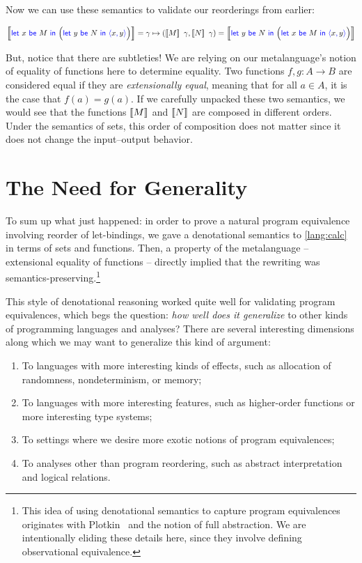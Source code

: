 Now we can use these semantics to validate our reorderings from earlier:
\begin{fullwidth}
\begin{align*}
  \dbracket{\pllet{x}{M}{\Big( \pllet{y}{N}{\plpair{x}{y}} \Big)}}
  = \gamma \mapsto (\dbracket{M}~\gamma, \dbracket{N}~\gamma)
  = \dbracket{\pllet{y}{N}{\Big( \pllet{x}{M}{\plpair{x}{y}} \Big)}}
\end{align*}
\end{fullwidth}

But, notice that there are subtleties! We are relying on our metalanguage's
notion of equality of functions here to determine equality. Two functions $f,g :
A \to B$ are considered equal if they are \emph{extensionally equal}, meaning
that for all $a \in A$, it is the case that $f(a) = g(a)$. 
If we carefully unpacked these two semantics, we would see that the functions 
$\left\llbracket M \right\rrbracket$ and $\left\llbracket N \right\rrbracket$ are composed in different orders. 
Under the semantics of sets, this order of composition does not matter since 
it does not change the input--output behavior.

\section{The Need for Generality}
To sum up what just happened: in order to prove a natural program equivalence 
involving reorder of let-bindings, we gave a denotational semantics to \ref{lang:calc} in terms
of sets and functions. Then, a property of the metalanguage -- extensional
equality of functions -- directly implied that the rewriting was
semantics-preserving.\footnote{This idea of using denotational semantics to 
capture program equivalences originates with Plotkin~\citep{plotkin1977lcf} and
the notion of full abstraction. We are intentionally eliding these details here,
since they involve defining observational equivalence.} 

This style of denotational reasoning worked quite well for validating program
equivalences, which begs the question: \emph{how well does it generalize} to
other kinds of programming languages and analyses?  There are several
interesting dimensions along which we may want to generalize this kind of
argument:
\begin{enumerate}
  \item To languages with more interesting kinds of effects, such as allocation
  of randomness, nondeterminism, or memory; 
  \item To languages with more interesting features, such as higher-order
  functions or more interesting type systems;
  \item To settings where we desire more exotic notions of program equivalences;
  \item To analyses other than program reordering, such as abstract interpretation 
  and logical relations.
\end{enumerate}


